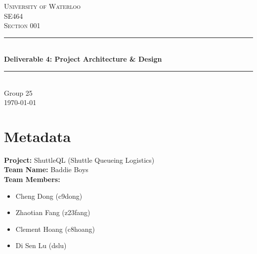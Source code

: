 \documentclass{article}
\begin{document}
\begin{titlepage}
\newcommand{\HRule}{\rule{\linewidth}{0.5mm}}

\center

\textsc{\huge University of Waterloo}\\[3cm]
\textsc{\LARGE SE464}\\[1.5cm]
\textsc{\Large Section 001}\\[1.5cm]

\HRule \\[0.75cm]
{ \Huge \bfseries Deliverable 4: Project Architecture \& Design}\\[0.5cm]
\HRule \\[2cm]

\Large Group 25 \\  [8cm]

{\Large \today}\\

\vfill
\end{titlepage}

\section{Metadata}
\textbf{Project:} ShuttleQL (Shuttle Queueing Logistics) \\
\textbf{Team Name:} Baddie Boys \\
\textbf{Team Members:}
\begin{itemize}
  \item Cheng Dong (c9dong)
  \item Zhaotian Fang (z23fang)
  \item Clement Hoang (c8hoang)
  \item Di Sen Lu (dslu)
\end{itemize}
\end{document}
